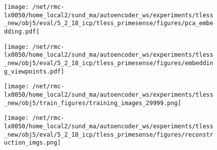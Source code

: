 \documentclass[a4paper,table]{article}
\begin{document}
\begin{figure}
\centering
\texttt{[image: /net/rmc-lx0050/home\_local2/sund\_ma/autoencoder\_ws/experiments/tless\_new/obj5/eval/5\_2\_18\_icp/tless\_primesense/figures/pca\_embedding.pdf]}
\end{figure}


\begin{figure}
\centering
\texttt{[image: /net/rmc-lx0050/home\_local2/sund\_ma/autoencoder\_ws/experiments/tless\_new/obj5/eval/5\_2\_18\_icp/tless\_primesense/figures/embedding\_viewpoints.pdf]}
\end{figure}


\begin{figure}
\centering
\texttt{[image: /net/rmc-lx0050/home\_local2/sund\_ma/autoencoder\_ws/experiments/tless\_new/obj5/train\_figures/training\_images\_29999.png]}
\end{figure}


\begin{figure}
\centering
\texttt{[image: /net/rmc-lx0050/home\_local2/sund\_ma/autoencoder\_ws/experiments/tless\_new/obj5/eval/5\_2\_18\_icp/tless\_primesense/figures/reconstruction\_imgs.png]}
\end{figure}
\end{document}
